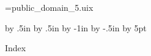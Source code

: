 








\openout\index=public_domain_5.uix








\begingroup
\advance\voffset by .5in
\advance\hoffset by .5in
\advance\hsize by -1in
\advance\vsize by -.5in
\advance\baselineskip by 5pt
\centerline{{\largebx Index}}
\baselineskip

\vfil\eject
\endgroup

\closeout\index

\Copying

\bye


